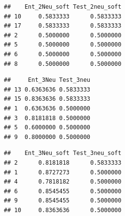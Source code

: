 \documentclass[]{article}
\newenvironment{Shaded}{\begin{snugshade}}{\end{snugshade}}
\newcommand{\KeywordTok}[1]{\textcolor[rgb]{0.13,0.29,0.53}{\textbf{#1}}}
\newcommand{\DataTypeTok}[1]{\textcolor[rgb]{0.13,0.29,0.53}{#1}}
\newcommand{\DecValTok}[1]{\textcolor[rgb]{0.00,0.00,0.81}{#1}}
\newcommand{\OperatorTok}[1]{\textcolor[rgb]{0.81,0.36,0.00}{\textbf{#1}}}
\newcommand{\NormalTok}[1]{#1}
\begin{document}
\begin{verbatim}
##    Ent_2Neu_soft Test_2neu_soft
## 10     0.5833333      0.5833333
## 17     0.5833333      0.5833333
## 2      0.5000000      0.5000000
## 5      0.5000000      0.5000000
## 6      0.5000000      0.5000000
## 8      0.5000000      0.5000000
\end{verbatim}

\begin{Shaded}
\end{Shaded}

\begin{verbatim}
##     Ent_3Neu Test_3neu
## 13 0.6363636 0.5833333
## 15 0.8363636 0.5833333
## 1  0.6363636 0.5000000
## 3  0.8181818 0.5000000
## 5  0.6000000 0.5000000
## 9  0.8000000 0.5000000
\end{verbatim}

\begin{Shaded}
\end{Shaded}

\begin{verbatim}
##    Ent_3Neu_soft Test_3neu_soft
## 2      0.8181818      0.5833333
## 1      0.8727273      0.5000000
## 4      0.7818182      0.5000000
## 6      0.8545455      0.5000000
## 9      0.8545455      0.5000000
## 10     0.8363636      0.5000000
\end{verbatim}

\begin{Shaded}
\end{Shaded}
\end{document}
